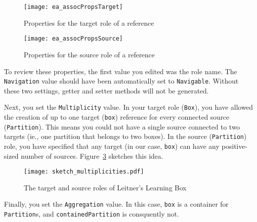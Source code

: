 \begin{itemize}
\vspace{0.5cm}

\begin{figure}[htbp]
	\centering
	  \texttt{[image: ea\_assocPropsTarget]}
	\caption{Properties for the target role of a reference}
	\label{fig:role_target}
\end{figure}
\FloatBarrier

\begin{figure}[htbp]
	\centering
    \texttt{[image: ea\_assocPropsSource]}
	\caption{Properties for the source role of a reference}
	\label{fig:role_source}
\end{figure}
\FloatBarrier

\end{itemize}

To review these properties, the first value you edited was the role name. The \texttt{Navigation} value should have been automatically set to
\texttt{Na\-vi\-ga\-ble}. Without these two settings, getter and setter methods will not be generated.

\vspace{0.5cm}

Next, you set the \texttt{Multiplicity} value. In your target role (\texttt{Box}), you have allowed the creation of up to one target (\texttt{box}) reference
for every connected source (\texttt{Partition}). This means you could not have a single source connected to two targets (ie., one partition that belongs to two
boxes). In the source (\texttt{Partition}) role, you have specified that any target (in our case, \texttt{box}) can have any positive-sized number of sources.
Figure~\ref{fig:sketch_roles} sketches this idea.

\vspace{0.5cm}

\begin{figure}[htbp]
	\centering
    \texttt{[image: sketch\_multiplicities.pdf]}
	\caption{The target and source roles of Leitner's Learning Box}
	\label{fig:sketch_roles}
\end{figure}
\FloatBarrier

Finally, you set the \texttt{Aggregation} value. In this case, \texttt{box} is a container for \texttt{Partition}s, and \texttt{containedPartition} is
consquently not.

